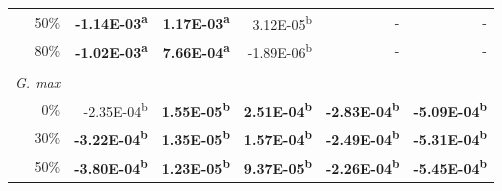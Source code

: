 \begin{landscape}
\begin{table}[]
{\begin{tabular}{p{2cm}p{3cm}p{3cm}p{3cm}p{3cm}p{3cm}}
              \multicolumn{1}{r}{50\%}                      
              &  \multicolumn{1}{r}{\textbf{-1.14E-03\textsuperscript{a}}}
              &  \multicolumn{1}{r}{\textbf{ 1.17E-03\textsuperscript{a}}} 
              &           \multicolumn{1}{r}{3.12E-05\textsuperscript{b}}                     
              & \multicolumn{1}{r}{-}                                                              
              & \multicolumn{1}{r}{-}  \\
              \multicolumn{1}{r}{80\%}                     
              &  \multicolumn{1}{r}{\textbf{-1.02E-03\textsuperscript{a}}}
              &  \multicolumn{1}{r}{\textbf{ 7.66E-04\textsuperscript{a}}} 
              &  \multicolumn{1}{r}{-1.89E-06\textsuperscript{b}}     
              &   \multicolumn{1}{r}{-}                                                            
              &   \multicolumn{1}{r}{-} \\
              &&&& \\
              \multicolumn{1}{l}{\textit{G. max}} \\
              \multicolumn{1}{r}{0\%}
              &  \multicolumn{1}{r}{ -2.35E-04\textsuperscript{b}}        
              &  \multicolumn{1}{r}{\textbf{ 1.55E-05\textsuperscript{b}}}                  
              &  \multicolumn{1}{r}{\textbf{ 2.51E-04\textsuperscript{b}}}
              &  \multicolumn{1}{r}{\textbf{-2.83E-04\textsuperscript{b}}}
              &  \multicolumn{1}{r}{\textbf{-5.09E-04\textsuperscript{b}}} \\
              
              \multicolumn{1}{r}{30\%}
              &  \multicolumn{1}{r}{\textbf{-3.22E-04\textsuperscript{b}}}
              &  \multicolumn{1}{r}{\textbf{ 1.35E-05\textsuperscript{b}}}
              &  \multicolumn{1}{r}{\textbf{ 1.57E-04\textsuperscript{b}}}
              &  \multicolumn{1}{r}{\textbf{-2.49E-04\textsuperscript{b}}}
              &  \multicolumn{1}{r}{\textbf{-5.31E-04\textsuperscript{b}}}  \\
              
              \multicolumn{1}{r}{50\%}
              &  \multicolumn{1}{r}{\textbf{-3.80E-04\textsuperscript{b}}}
              &  \multicolumn{1}{r}{\textbf{ 1.23E-05\textsuperscript{b}}}
              &  \multicolumn{1}{r}{\textbf{ 9.37E-05\textsuperscript{b}}}
              &  \multicolumn{1}{r}{\textbf{-2.26E-04\textsuperscript{b}}}
              &  \multicolumn{1}{r}{\textbf{-5.45E-04\textsuperscript{b}}}  \\
              

\end{tabular}}
\end{table}
\end{landscape}
